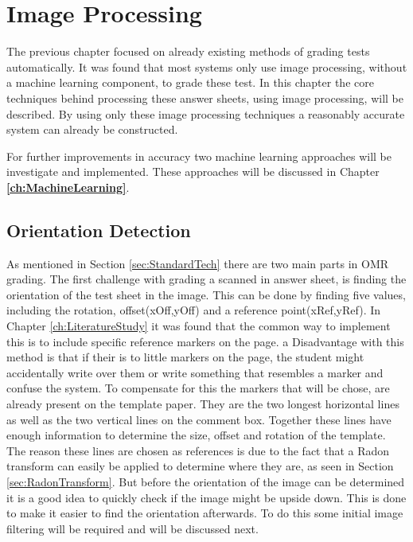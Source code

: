 \chapter{Image Processing}
\label{ch:ImageProcessing}

The previous chapter focused on already existing methods of grading tests automatically. It was found that most systems only use image processing, without a machine learning component, to grade these test. In this chapter the core techniques behind processing these answer sheets, using image processing, will be described. By using only these image processing techniques a reasonably accurate system can already be constructed.

For further improvements in accuracy two machine learning approaches will be investigate and implemented. These approaches will be discussed in Chapter \textbf{\ref{ch:MachineLearning}}.

\section{Orientation Detection}

As mentioned in Section \ref{sec:StandardTech} there are two main parts in OMR grading. The first challenge with grading a scanned in answer sheet, is finding the orientation of the test sheet in the image. This can be done by finding five values, including the rotation, offset(xOff,yOff) and a reference point(xRef,yRef). In Chapter \ref{ch:LiteratureStudy} it was found that the common way to implement this is to include specific reference markers on the page. a Disadvantage with this method is that if their is to little markers on the page, the student might accidentally write over them or write something that resembles a marker and confuse the system. To compensate for this the markers that will be chose, are already present on the template paper. They are the two longest horizontal lines as well as the two vertical lines on the comment box. Together these lines have enough information to determine the size, offset and rotation of the template. The reason these lines are chosen as references is due to the fact that a Radon transform can easily be applied to determine where they are, as seen in Section \ref{sec:RadonTransform}. But before the orientation of the image can be determined it is a good idea to quickly check if the image might be upside down. This is done to make it easier to find the orientation afterwards. To do this some initial image filtering will be required and will be discussed next.

